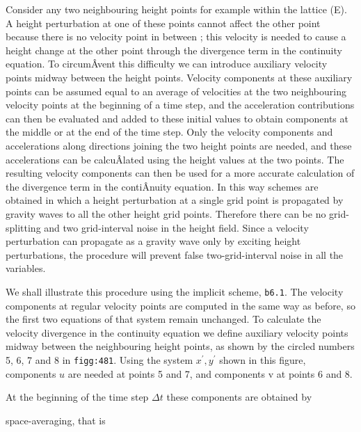 Consider any two neighbouring height points for example within the
lattice (E). A height perturbation at one of these points cannot affect
the other point because there is no velocity point in between ; this
velocity is needed to cause a height change at the other point through
the divergence term in the continuity equation. To circumÂ­vent this
difficulty we can introduce auxiliary velocity points midway between the
height points. Velocity components at these auxiliary points can be
assumed equal to an average of velocities at the two neighbouring
velocity points at the beginning of a time step, and the acceleration
contributions can then be evaluated and added to these initial values to
obtain components at the middle or at the end of the time step. Only the
velocity components and accelerations along directions joining the two
height points are needed, and these accelerations can be calcuÂ­lated
using the height values at the two points. The resulting velocity
components can then be used for a more accurate calculation of the
divergence term in the contiÂ­nuity equation. In this way schemes are
obtained in which a height perturbation at a single grid point is
propagated by gravity waves to all the other height grid points.
Therefore there can be no grid-splitting and two grid-interval noise in
the height field. Since a velocity perturbation can propagate as a
gravity wave only by exciting height perturbations, the procedure will
prevent false two-grid-interval noise in all the variables.

We shall illustrate this procedure using the implicit scheme,
\texttt{b6.1}. The velocity components at regular velocity points are
computed in the same way as before, so the first two equations of that
system remain unchanged. To calculate the velocity divergence in the
continuity equation we define auxiliary velocity points midway between
the neighbouring height points, as shown by the circled numbers 5, 6, 7
and 8 in \texttt{figg:481}. Using the system \(x^{'},y^{'}\) shown in
this figure, components \(u\) are needed at points 5 and 7, and
components v\textquotesingle{} at points 6 and 8.

At the beginning of the time step \(\Delta t\) these components are
obtained by


space-averaging, that is

